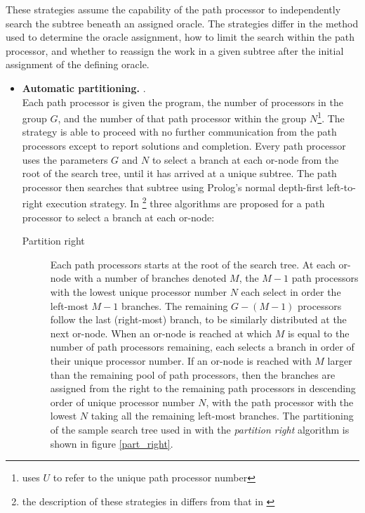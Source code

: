 These strategies assume the capability of the path processor to independently search the
subtree beneath an assigned oracle.  The strategies differ in the method used to
determine the oracle assignment, how to limit the search within the path processor, and
whether to reassign the work in a given subtree after the initial assignment of the
defining oracle.
\begin{itemize}
\item{\textbf{Automatic partitioning.} \cite{Kle91}.\\
  Each path processor is given the program, the number of processors in the group $G$,
  and the number of that path processor within the group $N$\footnote{\cite{Kle91}
  uses $U$ to refer to the unique path processor number}.  The strategy is able to
  proceed with no further communication from the path processors except to report
  solutions and completion.
  Every path processor uses the parameters $G$ and $N$ to select a branch at each
  or-node from the root of the search tree, until it has arrived at a unique
  subtree.  The path processor then searches that subtree using Prolog's normal
  depth-first left-to-right execution strategy.  In \cite{Kle91}\footnote{the
  description of these strategies in \cite{Sar95} differs from that in
  \cite{Kle91}} three algorithms are
  proposed for a path processor to select a branch at each or-node:
  \begin{description}
  \item[Partition right]{ Each path processors starts at the root of the search tree.  At
    each or-node with a number of branches denoted $M$, the $M-1$ path processors with the
    lowest unique processor number $N$ each select in order the left-most $M-1$ branches.  The
    remaining $G-(M-1)$ processors follow the last
    (right-most)  branch, to be similarly distributed at
    the next or-node.  When an or-node is reached at which $M$ is equal to the number
    of path processors remaining, each selects a branch in order of their unique processor
    number.  If an or-node is reached with $M$ larger than the remaining pool of path
    processors, then the branches are assigned from the right to the remaining path
    processors in descending order of unique processor number $N$, with the path processor
    with the lowest $N$ taking all the remaining left-most branches.  The partitioning of
    the sample search tree used in \cite{Kle91} with the \textit{partition right}
    algorithm is shown in figure \ref{part_right}.
\begin{figure}[h]

\end{figure}}
\end{description}}
\end{itemize}
